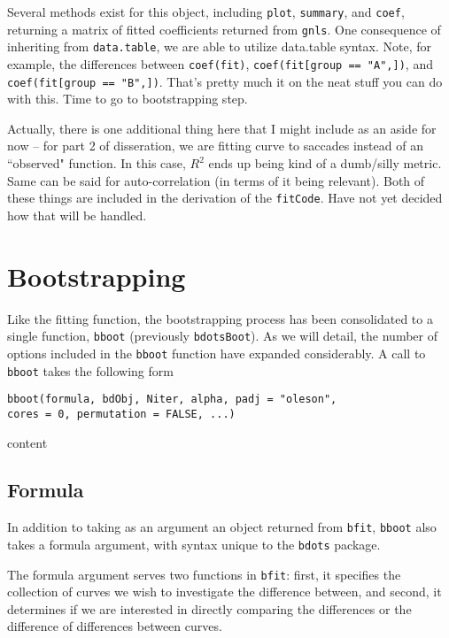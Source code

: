 \documentclass{article}
\newcommand{\xt}{\texttt}%
\begin{document}
Several methods exist for this object, including \texttt{plot}, \texttt{summary}, and \texttt{coef}, returning a matrix of fitted coefficients returned from \texttt{gnls}. One consequence of inheriting from \texttt{data.table}, we are able to utilize data.table syntax. Note, for example, the differences between \texttt{coef(fit)}, \texttt{coef(fit[group == "A",])}, and \texttt{coef(fit[group == "B",])}. That's pretty much it on the neat stuff you can do with this. Time to go to bootstrapping step.

Actually, there is one additional thing here that I might include as an aside for now -- for part 2 of disseration, we are fitting curve to saccades instead of an ``observed" function. In this case, $R^2$ ends up being kind of a dumb/silly metric. Same can be said for auto-correlation (in terms of it being relevant). Both of these things are included in the derivation of the \texttt{fitCode}. Have not yet decided how that will be handled. 

\section{Bootstrapping}

Like the fitting function, the bootstrapping process has been consolidated to a single function, \texttt{bboot} (previously \texttt{bdotsBoot}). As we will detail, the number of options included in the \xt{bboot} function have expanded considerably. A call to \xt{bboot} takes the following form

\begin{center}
\tt bboot(formula, bdObj, Niter, alpha,   padj = "oleson", \\ cores = 0, permutation = FALSE, ...)
\end{center}

content


\subsection{Formula}

In addition to taking as an argument an object returned from \texttt{bfit}, \texttt{bboot} also takes a formula argument, with syntax unique to the \texttt{bdots} package.

The formula argument serves two functions in \xt{bfit}: first, it specifies the collection of curves we wish to investigate the difference between, and second, it determines if we are interested in directly comparing the differences or the difference of differences between curves. 
\end{document}
